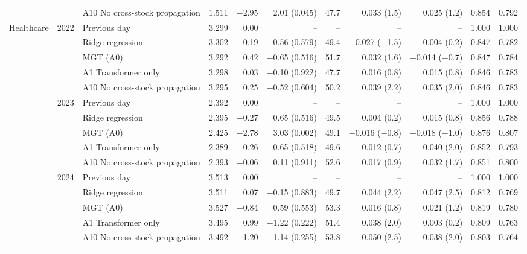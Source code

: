 \begin{table}[!t]
{\begin{tabular}{lllrrrrrrrr}
 &  & A10 No cross-stock propagation & 1.511 & $-$2.95 & 2.01 (0.045) & 47.7 & 0.033 (1.5) & 0.025 (1.2) & 0.854 & 0.792 \\
\addlinespace
\midrule
Healthcare & 2022 & Previous day & 3.299 & 0.00 & -- & -- & -- & -- & 1.000 & 1.000 \\
 &  & Ridge regression & 3.302 & $-$0.19 & 0.56 (0.579) & 49.4 & $-$0.027 ($-$1.5) & 0.004 (0.2) & 0.847 & 0.782 \\
 &  & MGT (A0) & 3.292 & 0.42 & $-$0.65 (0.516) & 51.7 & 0.032 (1.6) & $-$0.014 ($-$0.7) & 0.847 & 0.784 \\
 &  & A1 Transformer only & 3.298 & 0.03 & $-$0.10 (0.922) & 47.7 & 0.016 (0.8) & 0.015 (0.8) & 0.846 & 0.783 \\
 &  & A10 No cross-stock propagation & 3.295 & 0.25 & $-$0.52 (0.604) & 50.2 & 0.039 (2.2) & 0.035 (2.0) & 0.846 & 0.783 \\
\addlinespace
 & 2023 & Previous day & 2.392 & 0.00 & -- & -- & -- & -- & 1.000 & 1.000 \\
 &  & Ridge regression & 2.395 & $-$0.27 & 0.65 (0.516) & 49.5 & 0.004 (0.2) & 0.015 (0.8) & 0.856 & 0.788 \\
 &  & MGT (A0) & 2.425 & $-$2.78 & 3.03 (0.002) & 49.1 & $-$0.016 ($-$0.8) & $-$0.018 ($-$1.0) & 0.876 & 0.807 \\
 &  & A1 Transformer only & 2.389 & 0.26 & $-$0.65 (0.518) & 49.6 & 0.012 (0.7) & 0.040 (2.0) & 0.852 & 0.793 \\
 &  & A10 No cross-stock propagation & 2.393 & $-$0.06 & 0.11 (0.911) & 52.6 & 0.017 (0.9) & 0.032 (1.7) & 0.851 & 0.800 \\
\addlinespace
 & 2024 & Previous day & 3.513 & 0.00 & -- & -- & -- & -- & 1.000 & 1.000 \\
 &  & Ridge regression & 3.511 & 0.07 & $-$0.15 (0.883) & 49.7 & 0.044 (2.2) & 0.047 (2.5) & 0.812 & 0.769 \\
 &  & MGT (A0) & 3.527 & $-$0.84 & 0.59 (0.553) & 53.3 & 0.016 (0.8) & 0.021 (1.2) & 0.819 & 0.780 \\
 &  & A1 Transformer only & 3.495 & 0.99 & $-$1.22 (0.222) & 51.4 & 0.038 (2.0) & 0.003 (0.2) & 0.809 & 0.763 \\
 &  & A10 No cross-stock propagation & 3.492 & 1.20 & $-$1.14 (0.255) & 53.8 & 0.050 (2.5) & 0.038 (2.0) & 0.803 & 0.764 \\
\addlinespace
\bottomrule
\end{tabular}}
\end{table}